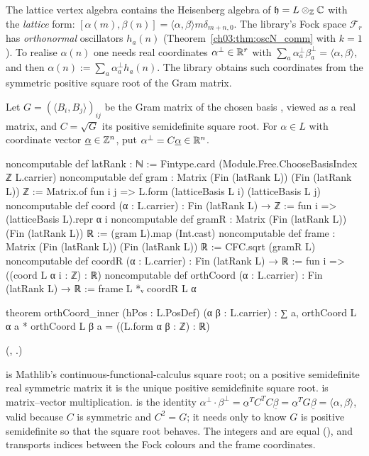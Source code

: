 The lattice vertex algebra contains the Heisenberg algebra of $\mathfrak h=L\otimes_{{\mathbb{Z}}}{\mathbb{C}}$ with the
\emph{lattice} form: $[\alpha(m),\beta(n)]=\langle\alpha,\beta\rangle m\delta_{m+n,0}$. The
library's Fock space $\mathcal F_r$ has \emph{orthonormal} oscillators $h_a(n)$
(Theorem~\ref{ch03:thm:oscN_comm} with $k=1$). To realise $\alpha(n)$ one needs real coordinates
$\alpha^{\perp}\in\mathbb{R}^r$ with $\sum_a\alpha^\perp_a\beta^\perp_a=\langle\alpha,\beta\rangle$, and then
$\alpha(n):=\sum_a\alpha^\perp_ah_a(n)$. The library obtains such coordinates from the symmetric
positive square root of the Gram matrix.

\begin{definition}\label{ch03:def:frame}
Let $G=(\langle B_i,B_j\rangle)_{ij}$ be the Gram matrix of the chosen basis
, viewed as a real matrix, and $C=\sqrt G$ its positive semidefinite square
root. For $\alpha\in L$ with coordinate vector $\underline\alpha\in{\mathbb{Z}}^n$, put
$\alpha^\perp=C\underline\alpha\in\mathbb{R}^n$.
\end{definition}
\begin{leancode}
noncomputable def latRank : ℕ := Fintype.card (Module.Free.ChooseBasisIndex ℤ L.carrier)
noncomputable def gram : Matrix (Fin (latRank L)) (Fin (latRank L)) ℤ :=
  Matrix.of fun i j => L.form (latticeBasis L i) (latticeBasis L j)
noncomputable def coord (α : L.carrier) : Fin (latRank L) → ℤ := fun i => (latticeBasis L).repr α i
noncomputable def gramR : Matrix (Fin (latRank L)) (Fin (latRank L)) ℝ :=
  (gram L).map (Int.cast)
noncomputable def frame : Matrix (Fin (latRank L)) (Fin (latRank L)) ℝ := CFC.sqrt (gramR L)
noncomputable def coordR (α : L.carrier) : Fin (latRank L) → ℝ := fun i => ((coord L α i : ℤ) : ℝ)
noncomputable def orthCoord (α : L.carrier) : Fin (latRank L) → ℝ := frame L *ᵥ coordR L α

theorem orthCoord_inner (hPos : L.PosDef) (α β : L.carrier) :
    ∑ a, orthCoord L α a * orthCoord L β a = ((L.form α β : ℤ) : ℝ)
\end{leancode}
(, .)

\begin{dictionary}
 is Mathlib's continuous-functional-calculus square root; on a positive
semidefinite real symmetric matrix it is the unique positive semidefinite square root.
 is matrix--vector multiplication.  is the identity
$\alpha^\perp\cdot\beta^\perp=\underline\alpha^TC^TC\underline\beta=\underline\alpha^TG\underline\beta
=\langle\alpha,\beta\rangle$, valid because $C$ is symmetric and $C^2=G$; it needs 
only to know $G$ is positive semidefinite so that the square root behaves. The integers
 and  are equal (), and
 transports indices between the Fock colours and
the frame coordinates.
\end{dictionary}

